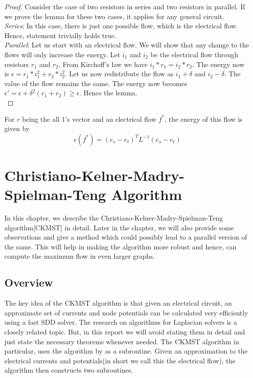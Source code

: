 \documentclass[BTech]{iitmdiss}
\begin{document}
		  \begin{proof}
		    Consider the case of two resistors in series and two resistors in parallel. If we prove the lemma for these two cases, it applies for 
		    any general circuit. \\
		    
		    \textit{Series}: In this case, there is just one possible flow, which is the electrical flow. Hence, statement trivially holds true. \\
		    
		    \textit{Parallel}:  Let us start with an electrical flow. We will show that any change to the flows will only increase the energy.
		    Let $i_1$ and $i_2$ be the electrical flow through resistors $r_1$ and $r_2$. From Kirchoff's law we have $i_1 \ast r_1 = i_2 \ast r_2 $.
		    The energy now is $\epsilon = r_1  \ast i_1^2 + r_2 \ast i_2^2$. Let us now redistribute the flow as $i_1 + \delta$ and $i_2 - \delta$. 
		    The value of the flow remains the same. The energy now becomes $\epsilon' = \epsilon + \delta^2(r_1+r_2) \geq \epsilon$. Hence the lemma. \\
 		  \end{proof}
 		  
		   \begin{prop} For $r$ being the all 1's vector and an electrical flow $f^{\ast}$, the energy of this flow is given by
		      $$\epsilon(f^{\ast}) = (e_s - e_t)^T L^{-1} (e_s-e_t)$$
		    
		   \end{prop}
 
		
		
		
	      
	      
	 \chapter{Christiano-Kelner-Madry-Spielman-Teng Algorithm}
	    In this chapter, we describe the Christiano-Kelner-Madry-Spielman-Teng algorithm[CKMST] in detail. Later in the chapter,
	 we will also provide some observations and give a method which could possibly lead to a parallel version of the same. This will help in 
	 making the algorithm more robust and hence, can compute the maximum flow in even larger graphs.\\
	 
	 \section{Overview}
	    The key idea of the CKMST algorithm is that given an electrical circuit, an approximate set of currents and node potentials can be calculated
	 very efficiently using a fast SDD solver. The research on algorithms for Laplacian solvers is a closely related topic. But, 
	 in this report we will avoid stating them in detail and just state the necessary theorems whenever needed. The CKMST algorithm in
	 particular, uses the algorithm by \cite{DBLP:journals/corr/abs-1003-2958} as a subroutine. Given an approximation to the 
	 electrical currents and potentials(in short we call this the electrical flow), the algorithm then constructs two subroutines. 
	 
\end{document}
